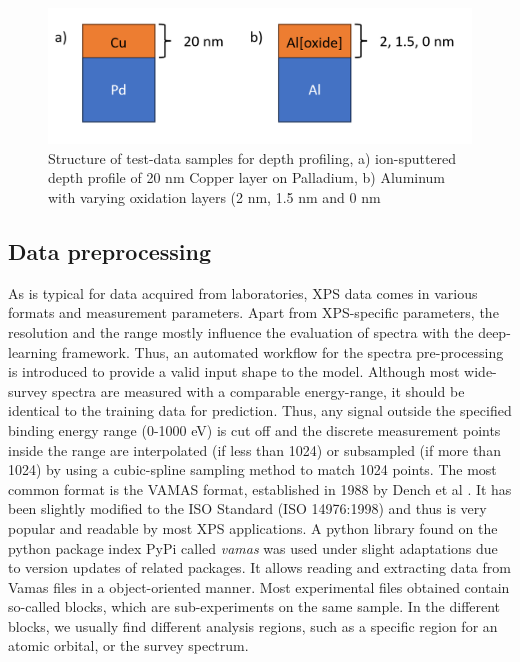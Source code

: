 \begin{figure}
    \centering
    \includegraphics[width=\textwidth]{Figures/experimental_samples.png}
    \caption{Structure of test-data samples for depth profiling, a) ion-sputtered depth profile of 20 nm Copper layer on Palladium, b) Aluminum with varying oxidation layers (2 nm, 1.5 nm and 0 nm}
    \label{fig:exp_samples}
\end{figure}


\subsection{Data preprocessing}

As is typical for data acquired from laboratories, XPS data comes in various formats and measurement parameters. Apart from XPS-specific parameters, the resolution and the range mostly influence the evaluation of spectra with the deep-learning framework. Thus, an automated workflow for the spectra pre-processing is introduced to provide a valid input shape to the model.
Although most wide-survey spectra are measured with a comparable energy-range, it should be identical to the training data for prediction. Thus, any signal outside the specified binding energy range (0-1000 eV) is cut off and the discrete measurement points inside the range are interpolated (if less than 1024) or subsampled (if more than 1024) by using a cubic-spline sampling method to match 1024 points. The most common format is the VAMAS format, established in 1988 by Dench et al \cite{dench_vamas_1988}. It has been slightly modified to the ISO Standard \cite{1400-1700_iso_nodate}(ISO 14976:1998) and thus is very popular and readable by most XPS applications. A python library found on the python package index PyPi called \emph{vamas} \cite{krinninger_vamas_nodate} was used under slight adaptations due to version updates of related packages. It allows reading and extracting data from Vamas files in a object-oriented manner.
Most experimental files obtained contain so-called blocks, which are sub-experiments on the same sample. In the different blocks, we usually find different analysis regions, such as a specific region for an atomic orbital, or the survey spectrum.

